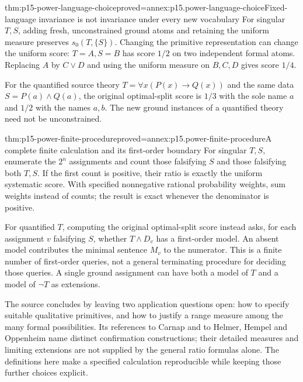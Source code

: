 \begin{hbtheorem}{thm:p15-power-language-choice}{proved=annex:p15.power-language-choice}{Fixed-language invariance is not invariance under every new vocabulary}
For singular \(T,S\), adding fresh, unconstrained
ground atoms and retaining the uniform measure
preserves \(s_0(T,\{S\})\).
Changing the primitive representation can
change the uniform score: \(T=A,S=B\)
has score \(1/2\) on two independent formal
atoms. Replacing \(A\) by \(C\lor D\)
and using the uniform measure on \(B,C,D\)
gives score \(1/4\).

For the quantified source theory
\(T=\forall x(P(x)\to Q(x))\) and
the same data \(S=P(a)\land Q(a)\),
the original optimal-split score is \(1/3\)
with the sole name \(a\) and \(1/2\)
with the names \(a,b\).
The new ground instances of a quantified
theory need not be unconstrained.
\end{hbtheorem}

\begin{hbtheorem}{thm:p15-power-finite-procedure}{proved=annex:p15.power-finite-procedure}{A complete finite calculation and its first-order boundary}
For singular \(T,S\), enumerate the \(2^n\)
assignments and count those falsifying \(S\)
and those falsifying both \(T,S\).
If the first count is positive, their ratio
is exactly the uniform systematic score.
With specified nonnegative rational probability weights,
sum weights instead of counts; the result
is exact whenever the denominator is positive.

For quantified \(T\), computing the original
optimal-split score instead asks, for each
assignment \(v\) falsifying \(S\), whether
\(T\land D_v\) has a first-order model.
An absent model contributes the minimal
sentence \(M_v\) to the numerator.
This is a finite number of first-order
queries, not a general terminating procedure
for deciding those queries. A single ground
assignment can have both a model of \(T\)
and a model of \(\neg T\) as extensions.
\end{hbtheorem}

The source concludes by leaving two application
questions open: how to specify suitable qualitative
primitives, and how to justify a range measure
among the many formal possibilities.
Its references to Carnap and to Helmer,
Hempel and Oppenheim name distinct confirmation
constructions; their detailed measures and
limiting extensions are not supplied by
the general ratio formulas alone.
The definitions here make a specified
calculation reproducible while keeping
those further choices explicit.
